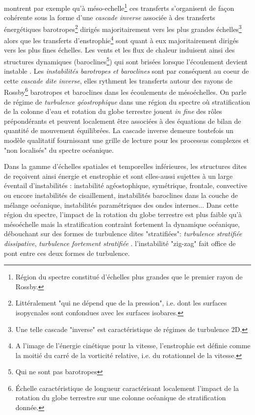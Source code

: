 \color{blue}
\cite{salmon_baroclinic_1980} montrent par exemple qu'à méso-echelle\footnote{Région du spectre constitué d'échelles plus grandes que le premier rayon de Rossby.} ces transferts s'organisent de façon cohérente sous la forme d'une \textit{cascade inverse} associée à des transferts énergétiques barotropes\footnote{Littéralement "qui ne dépend que de la pression", i.e. dont les surfaces isopycnales sont confondues avec les surfaces isobares.} dirigés majoritairement vers les plus grandes échelles\footnote{Une telle cascade "inverse" est caractéristique de régimes de turbulence 2D.} alors que les transferts d'enstrophie\footnote{A l'image de l'énergie cinétique pour la vitesse, l'enstrophie est définie comme la moitié du carré de la vorticité relative, i.e. du rotationnel de la vitesse.} sont quant à eux majoritairement dirigés vers les plus fines échelles. 
Les vents et les flux de chaleur induisent ainsi des structures dynamiques (baroclines\footnote{Qui ne sont pas barotropes}) qui sont brisées lorsque l'écoulement devient instable \citep{vallis_atmospheric_2006}.
Les \textit{instabilités barotropes et baroclines} sont par conséquent au coeur de cette \textit{cascade dite inverse}, elles rythment les transferts autour des rayons de Rossby\footnote{Échelle caractéristique de longueur caractérisant localement l'impact de la rotation du globe terrestre sur une colonne océanique de stratification donnée.} barotropes et baroclines dans les écoulements de mésoéchelles. On parle de régime de \textit{turbulence géostrophique} \citep{charney_geostrophic_1971} dans une région du spectre où stratification de la colonne d'eau et rotation du globe terrestre jouent \textit{in fine} des rôles prépondérants et peuvent localement être associées à des équations de bilan de quantité de mouvement équilibrées. La cascade inverse demeure toutefois un modèle qualitatif fournissant une grille de lecture pour les processus complexes et "non localisés" du spectre océanique.

Dans la gamme d'échelles spatiales et temporelles inférieures, les structures dites de  reçoivent ainsi énergie et enstrophie et sont elles-aussi sujettes à un large éventail d'instabilités \citep{mcwilliams_submesoscale_2016}: instabilité agéostophique, symétrique, frontale, convective ou encore instabilités de cisaillement, instabilités baroclines dans la couche de mélange océanique, instabilités paramétriques des ondes internes... Dans cette région du spectre, l'impact de la rotation du globe terrestre est plus faible qu'à mésoéchelle mais la stratification contraint fortement la dynamique océanique, débouchant sur des formes de turbulence dites "stratifiées": \textit{turbulence stratifiée dissipative}, \textit{turbulence fortement stratifiée} \citep{augier_turbulence_2012}. l'instabilité "zig-zag" fait office de pont entre ces deux formes de turbulence.

